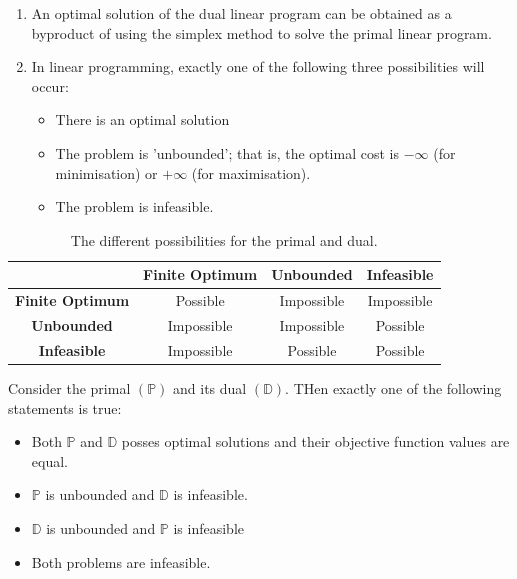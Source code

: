 \documentclass{article}
\begin{document}
\begin{enumerate}
    \item An optimal solution of the dual linear program can be obtained as a byproduct of using the simplex method to solve the primal linear program. 
    \item In linear programming, exactly one of the following three possibilities will occur: \begin{itemize}
        \item There is an optimal solution 
        \item The problem is 'unbounded'; that is, the optimal cost is $-\infty$ (for minimisation) or $+\infty$ (for maximisation). 
        \item The problem is infeasible.
    \end{itemize}
\end{enumerate}

\begin{table}[H]
    \centering
    \begin{tabular}{| c || c | c | c |}
        & \textbf{Finite Optimum} & \textbf{Unbounded} & \textbf{Infeasible} \\ \hline \hline 
        \textbf{Finite Optimum} & Possible & Impossible & Impossible \\ \hline 
        \textbf{Unbounded} & Impossible & Impossible & Possible \\ \hline 
        \textbf{Infeasible} & Impossible & Possible & Possible \\ \hline 
    \end{tabular}
    \caption{The different possibilities for the primal and dual.}
    \label{tab:6-strongdualitypossibility}
\end{table}


\begin{theorem}
    Consider the primal $(\mathbb{P})$ and its dual $(\mathbb{D})$. THen exactly one of the following statements is true: \begin{itemize}
        \item Both $\mathbb{P}$ and $\mathbb{D}$ posses optimal solutions and their objective function values are equal. 
        \item $ \mathbb{P}$ is unbounded and $ \mathbb{D}$ is infeasible. 
        \item $ \mathbb{D}$ is unbounded and $ \mathbb{P}$ is infeasible 
        \item Both problems are infeasible. 
    \end{itemize}
\end{theorem}
\end{document}
